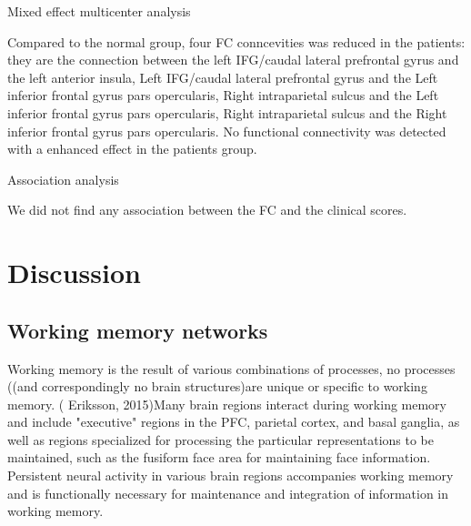 \documentclass[preprint,authoryear,review,12pt]{elsarticle}
\begin{document}
Mixed effect multicenter analysis

Compared to the normal group, four FC conncevities was reduced in the patients: they are the connection between the left IFG/caudal lateral prefrontal gyrus and the left anterior insula, Left IFG/caudal lateral prefrontal gyrus and the Left inferior frontal gyrus pars opercularis, Right intraparietal sulcus and the Left inferior frontal gyrus pars opercularis, Right intraparietal sulcus and the Right inferior frontal gyrus pars opercularis. No functional connectivity was detected with a enhanced effect in the patients group.  


Association analysis

We did not find any association between the FC and the clinical scores.
\section*{Discussion} 

\subsection*{Working memory networks}


Working memory is the result of various combinations of processes, no processes ((and correspondingly no brain structures)are unique or specific to working memory. ( Eriksson, 2015)Many brain regions interact during working memory and include "executive" regions in the PFC, parietal cortex, and basal ganglia, as well as regions specialized for processing the particular representations to be maintained, such as the fusiform face area for maintaining face information. Persistent neural activity in various brain regions accompanies working memory and is functionally necessary for maintenance and integration of information in working memory.
\end{document}
